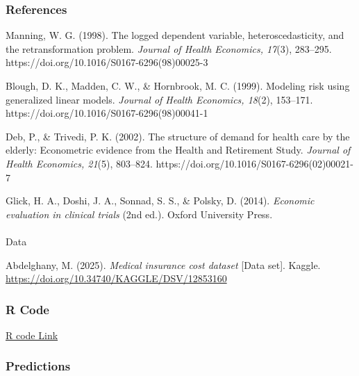 \documentclass[
  letterpaper,
  DIV=11,
  numbers=noendperiod]{scrartcl}
\makeatletter
\let\oldparagraph\paragraph
\renewcommand{\paragraph}{
    \@ifstar
      \xxxParagraphStar
      \xxxParagraphNoStar
  }
\newcommand{\xxxParagraphStar}[1]{\oldparagraph*{#1}\mbox{}}
\newcommand{\xxxParagraphNoStar}[1]{\oldparagraph{#1}\mbox{}}
\makeatother
\begin{document}
\subsubsection{References}\label{references}

Manning, W. G. (1998). The logged dependent variable,
heteroscedasticity, and the retransformation problem. \emph{Journal of
Health Economics, 17}(3), 283--295.
https://doi.org/10.1016/S0167-6296(98)00025-3

Blough, D. K., Madden, C. W., \& Hornbrook, M. C. (1999). Modeling risk
using generalized linear models. \emph{Journal of Health Economics,
18}(2), 153--171. https://doi.org/10.1016/S0167-6296(98)00041-1

Deb, P., \& Trivedi, P. K. (2002). The structure of demand for health
care by the elderly: Econometric evidence from the Health and Retirement
Study. \emph{Journal of Health Economics, 21}(5), 803--824.
https://doi.org/10.1016/S0167-6296(02)00021-7

Glick, H. A., Doshi, J. A., Sonnad, S. S., \& Polsky, D. (2014).
\emph{Economic evaluation in clinical trials} (2nd ed.). Oxford
University Press.

\paragraph{Data}\label{data-1}

Abdelghany, M. (2025). \emph{Medical insurance cost dataset} {[}Data
set{]}. Kaggle. \url{https://doi.org/10.34740/KAGGLE/DSV/12853160}

\subsubsection{R Code}\label{r-code}

\href{https://github.com/DW8888/data621/blob/main/FinalProject/analysis.Rmd}{R
code Link}

\subsubsection{Predictions}\label{predictions}
\end{document}
